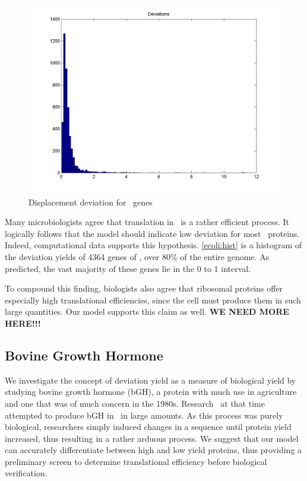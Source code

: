 \documentclass[12pt]{article}
\numberwithin{equation}{section}
\begin{document}

\begin{figure}
  \centering
  \caption{Displacement deviation for \ecoli\ genes}
  \label{ecoli:hist}
  \includegraphics[scale=0.2]{histograms/everything}
\end{figure}

Many microbiologists agree that translation in \ecoli\ is a rather efficient
process.  It logically follows that the model should indicate low deviation
for most \ecoli\ proteins.  Indeed, computational data supports this hypothesis.
\autoref{ecoli:hist} is a histogram of the deviation yields of 4364 genes of
\ecoli, over 80\% of the entire genome.  As predicted, the vast majority
of these genes lie in the 0 to 1 interval.

To compound this finding, biologists also agree that ribosomal proteins
offer especially high translational efficiencies, since the cell must produce
them in such large quantities.  Our model supports this claim as well.
{\textbf{WE NEED MORE HERE!!!}}

\subsection{Bovine Growth Hormone}
\label{section:bgh}


We investigate the concept of deviation yield as a measure of biological
yield by studying bovine growth hormone (bGH), a protein with much use in agriculture
and one that was of much concern in the 1980s.
Research~\cite{schoner:bgh} at that time attempted to produce bGH
in \ecoli\ in large amounts.  As this process was purely biological, researchers
simply induced changes in a sequence until protein yield increased, thus resulting
in a rather arduous process.  We suggest that our model can accurately
differentiate between high and low yield proteins, thus providing a preliminary screen
to determine translational efficiency before biological verification.
\end{document}
